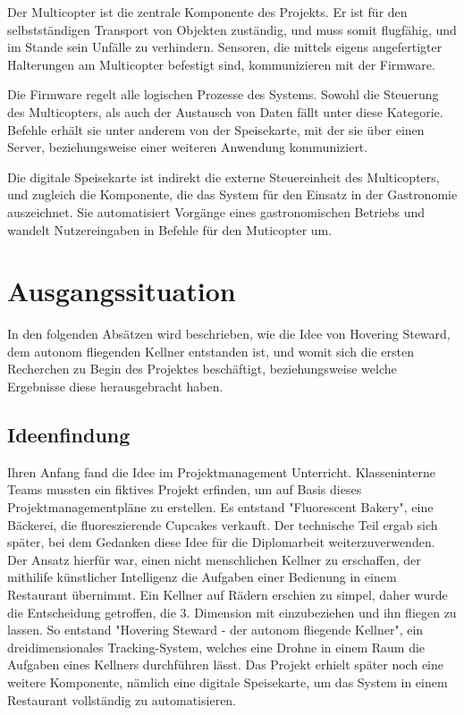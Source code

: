 Der Multicopter ist die zentrale Komponente des Projekts. Er ist für den selbstständigen Transport von Objekten zuständig,
und muss somit flugfähig, und im Stande sein Unfälle zu verhindern. Sensoren, die mittels eigens angefertigter Halterungen
am Multicopter befestigt sind, kommunizieren mit der Firmware.

Die Firmware regelt alle logischen Prozesse des Systems. Sowohl die Steuerung des Multicopters, als auch der
Austausch von Daten fällt unter diese Kategorie. Befehle erhält sie unter anderem von der Speisekarte, mit der sie über
einen Server, beziehungsweise einer weiteren Anwendung kommuniziert.

Die digitale Speisekarte ist indirekt die externe Steuereinheit des Multicopters, und zugleich die Komponente,
die das System für den Einsatz in der Gastronomie auszeichnet. Sie automatisiert Vorgänge eines gastronomischen
Betriebs und wandelt Nutzereingaben in Befehle für den Muticopter um.

\section{Ausgangssituation}
  In den folgenden Absätzen wird beschrieben, wie die Idee von Hovering Steward, dem autonom fliegenden Kellner
  entstanden ist, und womit sich die ersten Recherchen zu Begin des Projektes beschäftigt, beziehungsweise
  welche Ergebnisse diese herausgebracht haben.

  \subsection{Ideenfindung}
  Ihren Anfang fand die Idee im Projektmanagement Unterricht. Klasseninterne Teams mussten ein fiktives Projekt erfinden, um auf Basis dieses
  Projektmanagementpläne zu erstellen. Es entstand "Fluorescent Bakery", eine Bäckerei, die fluoreszierende Cupcakes verkauft.
  Der technische Teil ergab sich später, bei dem Gedanken diese Idee für die Diplomarbeit weiterzuverwenden. Der Ansatz hierfür war,
  einen nicht menschlichen Kellner zu erschaffen, der mithilife künstlicher Intelligenz die Aufgaben einer Bedienung in einem Restaurant übernimmt.
  Ein Kellner auf Rädern erschien zu simpel, daher wurde die Entscheidung getroffen, die 3. Dimension mit einzubeziehen und ihn fliegen zu lassen.
  So entstand "Hovering Steward - der autonom fliegende Kellner", ein dreidimensionales Tracking-System, welches eine Drohne in einem Raum die Aufgaben eines Kellners durchführen lässt.
  Das Projekt erhielt später noch eine weitere Komponente, nämlich eine digitale Speisekarte, um das System in einem Restaurant vollständig zu automatisieren.

